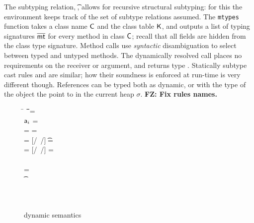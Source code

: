 \documentclass[acmlarge, anonymous, authordraft]{acmart}
\newcommand{\FZ}[1]{\textbf{FZ: #1}}
\begin{document}
The
subtyping relation, \StrSub\M\K\t\tp, allows for recursive structural
subtyping: for this the environment \M keeps track of the set of subtype relations assumed.  The \texttt{mtypes} function takes a class name ${\sf{C}}$ and the class table
${\sf{K}}$, and outputs a list of typing signatures $\overline{{\sf{mt}}}$ for every method in
class ${\sf{C}}$; recall that all fields are hidden from the class type signature. 
Method calls use \emph{syntactic} disambiguation to select between
typed and untyped methods. The dynamically resolved call places no
requirements on the receiver or argument, and returns type \any. 
Statically subtype cast rules  and  are similar; how their soundness is enforced at run-time is very different though.  References can be typed both as dynamic, or with the type of the object the point to in the current heap \(\sigma\).   \FZ{Fix rules names.}



%
\begin{figure}[!t]
\noindent\hrulefill


\medskip
\small

\begin{minipage}{\textwidth}
\small        
\begin{tabbing}
\K\HS \New\C{\b\a} \HS\HS\HS\= \s~ \HS\HS \=\Red\HS\HS \= \K \HS\= \ap \HS\HS\= \sp\HS\HS \= \WHERE\HS\= \fresh\ap \HS\HS\HS\HS\HS\HS\HS\HS\=  \sp = {\Map{}}
\\
\K\HS \FReadR{} \> \s           \>\Red\>     \K \>${\sf{a}}_i$ \> \s  \> \WHERE \>\App\s\a=\obj{}
\\
\K{} \> \s     \>\Red\>     \K \> \ap \> \sp \>  \WHERE \>\App\s\a=\obj{} \HS  \> \sp = \Map{}
\\
\K\HS{\KCall\a\m\ap\t\tp} \> \s    \>\Red\>     \K \>  \ep \> \s \> \WHERE\> \ep = {[\a/\this~{\ap/\x}]\e} \HS \> \Mdef\m\x\t\tp\e\In \App\K\C  \HS  \App\s\a=\obj{}
\\
 \K\HS {\DynCall\a\m\ap}\> \s        \>\Red\>    \K \> \ep \> \s \>  \WHERE\> \ep = {[\a/\this~{\ap/\x}]\e}\HS \> \Mdef\m\x\any\any\e \In \App\K\C \HS \App\s\a=\obj{}
\\
 \K\HS {\SubCast \any\a} \> \s       \>\Red\>   \K \> \a \> \s
\\
 \K\HS {\SubCast \D\a} \> \s        \>\Red\>    \K \> \a \> \s \>  \WHERE\> \StrSub {}\K\C \D \>\App\s\a=\obj{} 
\\
 \K\HS {\BehCast \t\a} \> \s         \>\Red\>   \Kp \> \ap \> \sp \> \WHERE\> \behcast \a\t\s\K \Kp\ap\sp    
\\
\K\HS\e \>\s                         \>\Red\>   \Kp \> \ep \> \sp
\\
 \K \HS \EM{\EE[\e]} \> \s               \>\Red\>   \Kp \> \EM{\EE[\ep]} \> \sp \> \WHERE \> \K~\e~\s \Red~\Kp~\ep~\sp
\end{tabbing}
\end{minipage}

\medskip

\hrulefill
\caption{\kafka dynamic semantics}\label{fig:semantics}
\end{figure}
\end{document}
